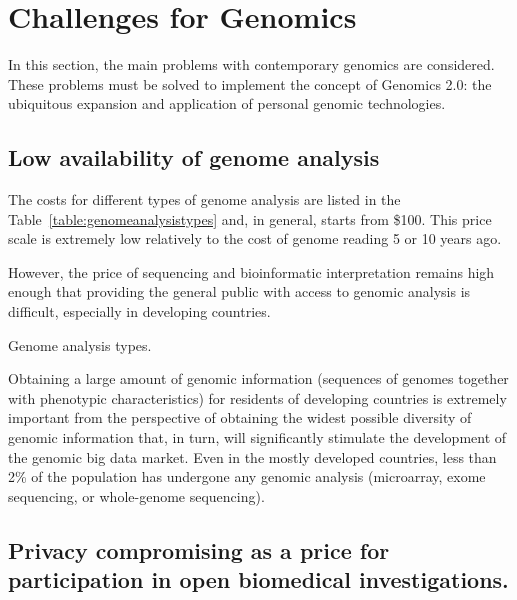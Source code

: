 \section{Challenges for Genomics} %
\begin{overview}
In this section, the main problems with contemporary genomics are considered. These problems must be solved to implement the concept of Genomics 2.0: the ubiquitous expansion and application of personal genomic technologies.
\end{overview}



\subsection{Low availability of genome analysis}

The costs for different types of genome analysis are listed in the Table~\ref{table:genomeanalysistypes} and, in general, starts from \$100. This price scale is extremely low relatively to the cost of genome reading 5 or 10 years ago\cite{Sboner2011}.

However, the price of sequencing and bioinformatic interpretation remains high enough that providing the general public with access to genomic analysis is difficult, especially in developing countries.


\begin{table}[H]
\caption{Genome analysis types.}
\label{table:genomeanalysistypes}

\end{table}

Obtaining a large amount of genomic information (sequences of genomes together with phenotypic characteristics) for residents of developing countries is extremely important from the perspective of obtaining the widest possible diversity of genomic information that, in turn, will significantly stimulate the development of the genomic big data market. Even in the mostly developed countries, less than 2\% of the population has undergone any genomic analysis (microarray, exome sequencing, or whole-genome sequencing).




\subsection[Privacy compromising as a price for participation]{%
  Privacy compromising as a price for participation in open biomedical investigations.}

